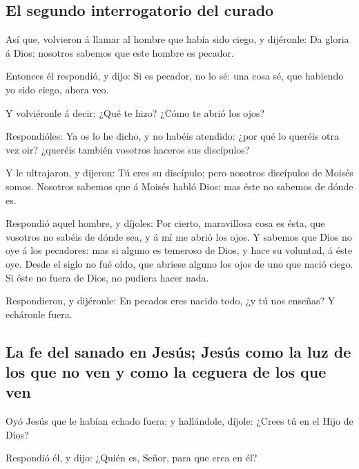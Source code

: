 \hypertarget{el-segundo-interrogatorio-del-curado}{%
\subsection{El segundo interrogatorio del
curado}\label{el-segundo-interrogatorio-del-curado}}

 Así que, volvieron á llamar al hombre que había sido
ciego, y dijéronle: Da gloria á Dios: nosotros sabemos que este hombre
es pecador.

 Entonces él respondió, y dijo: Si es pecador, no lo sé:
una cosa sé, que habiendo yo sido ciego, ahora veo.

 Y volviéronle á decir: ¿Qué te hizo? ¿Cómo te abrió los
ojos?

 Respondióles: Ya os lo he dicho, y no habéis atendido:
¿por qué lo queréis otra vez oir? ¿queréis también vosotros haceros sus
discípulos?

 Y le ultrajaron, y dijeron: Tú eres su discípulo; pero
nosotros discípulos de Moisés somos.  Nosotros sabemos que
á Moisés habló Dios: mas éste no sabemos de dónde es.

 Respondió aquel hombre, y díjoles: Por cierto, maravillosa
cosa es ésta, que vosotros no sabéis de dónde sea, y á mí me abrió los
ojos.  Y sabemos que Dios no oye á los pecadores: mas si
alguno es temeroso de Dios, y hace su voluntad, á éste oye.
 Desde el siglo no fué oído, que abriese alguno los ojos de
uno que nació ciego.  Si éste no fuera de Dios, no pudiera
hacer nada.

 Respondieron, y dijéronle: En pecados eres nacido todo, ¿y
tú nos enseñas? Y echáronle fuera.

\hypertarget{la-fe-del-sanado-en-jesuxfas-jesuxfas-como-la-luz-de-los-que-no-ven-y-como-la-ceguera-de-los-que-ven}{%
\subsection{La fe del sanado en Jesús; Jesús como la luz de los que no
ven y como la ceguera de los que
ven}\label{la-fe-del-sanado-en-jesuxfas-jesuxfas-como-la-luz-de-los-que-no-ven-y-como-la-ceguera-de-los-que-ven}}

 Oyó Jesús que le habían echado fuera; y hallándole,
díjole: ¿Crees tú en el Hijo de Dios?

 Respondió él, y dijo: ¿Quién es, Señor, para que crea en
él?


